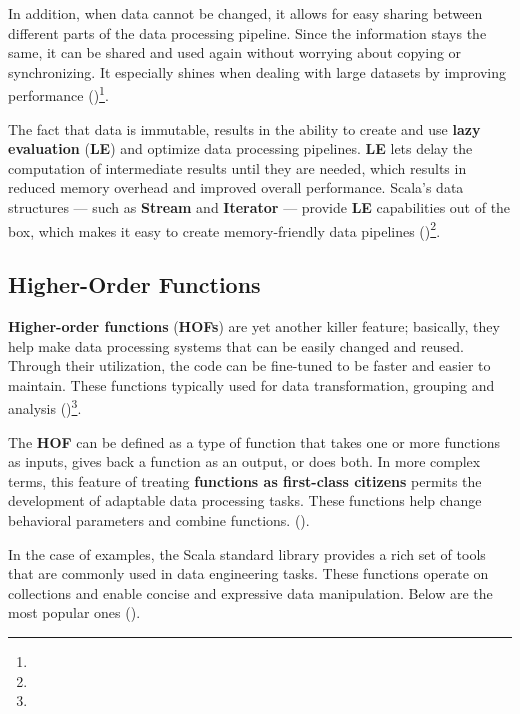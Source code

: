 

In addition, when data cannot be changed, it allows for easy sharing  between different parts of the data processing pipeline. Since the information stays the same, it can be shared and used again without worrying about copying or synchronizing. It especially shines when dealing with large datasets by improving performance (\cite{tomeDataEngineeringScala2024})\footnote[10]{}.



The fact that data is immutable, results in the ability to create and use \textbf{lazy evaluation} (\textbf{LE}) and optimize data processing pipelines. \textbf{LE} lets delay the computation of intermediate results until they are needed, which results in reduced memory overhead and improved overall performance. Scala's data structures — such as \textbf{Stream} and \textbf{Iterator} — provide \textbf{LE} capabilities out of the box, which makes it easy to create memory-friendly data pipelines (\cite{tomeDataEngineeringScala2024})\footnote[10]{}.



\subsection{Higher-Order Functions}

\textbf{Higher-order functions} (\textbf{HOFs}) are yet another killer feature; basically, they help make data processing systems that can be easily changed and reused. Through their utilization, the code can be fine-tuned to be faster and easier to maintain. These functions typically used for data transformation, grouping and analysis (\cite{michael.etal_2023})\footnote[11]{}.

The \textbf{HOF} can be defined as a type of function that takes one or more functions as inputs, gives back a function as an output, or does both. In more complex terms, this feature of treating \textbf{functions as first-class citizens} permits the development of adaptable data processing tasks. These functions help change behavioral parameters and combine functions. (\cite{michael.etal_2023})\footnotemark[11].

In the case of examples, the Scala standard library provides a rich set of tools that are commonly used in data engineering tasks. These functions operate on collections and enable concise and expressive data manipulation. Below are the most popular ones (\cite{michael.etal_2023})\footnotemark[11].

